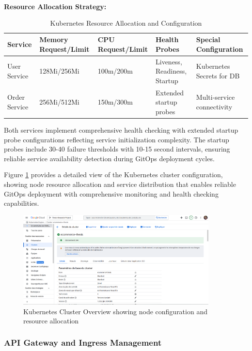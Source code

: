 \textbf{Resource Allocation Strategy:}

\begin{table}[H]
\centering
\caption{Kubernetes Resource Allocation and Configuration}
\label{tab:kubernetes-resource-allocation}
\begin{tabular}{|p{3cm}|p{2.5cm}|p{2.5cm}|p{3cm}|p{3cm}|}
\hline
\textbf{Service} & \textbf{Memory Request/Limit} & \textbf{CPU Request/Limit} & \textbf{Health Probes} & \textbf{Special Configuration} \\
\hline
User Service & 128Mi/256Mi & 100m/200m & Liveness, Readiness, Startup & Kubernetes Secrets for DB \\
\hline
Order Service & 256Mi/512Mi & 150m/300m & Extended startup probes & Multi-service connectivity \\
\hline
\end{tabular}
\end{table}

Both services implement comprehensive health checking with extended startup probe configurations reflecting service initialization complexity. The startup probes include 30-40 failure thresholds with 10-15 second intervals, ensuring reliable service availability detection during GitOps deployment cycles.

Figure \ref{fig:kubernetes-cluster-overview} provides a detailed view of the Kubernetes cluster configuration, showing node resource allocation and service distribution that enables reliable GitOps deployment with comprehensive monitoring and health checking capabilities.

\begin{figure}[H]
\centering
\includegraphics[width=0.9\textwidth]{figures/chapter4/kubernetes-cluster-overview.png}
\caption{Kubernetes Cluster Overview showing node configuration and resource allocation}
\label{fig:kubernetes-cluster-overview}
\end{figure}

\subsubsection{API Gateway and Ingress Management}

